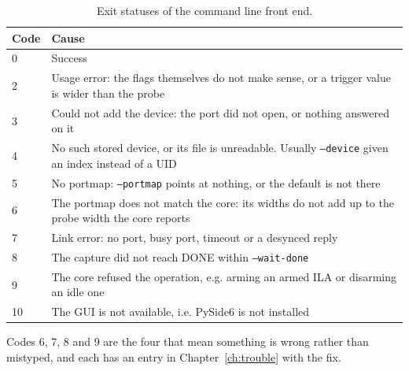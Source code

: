 \documentclass[../manual.tex]{subfiles}
\begin{document}
\begin{table}[H]
    \centering
    \begin{tabularx}{\textwidth}{|l|X|}
        \hline
        \rowcolor{gray!40} \textbf{Code} & \textbf{Cause} \\
        \hline
        0 & Success \\
        \hline
        2 & Usage error: the flags themselves do not make sense, or a trigger value is wider than the probe \\
        \hline
        3 & Could not add the device: the port did not open, or nothing answered on it \\
        \hline
        4 & No such stored device, or its file is unreadable. Usually \texttt{--device} given an index instead of a UID \\
        \hline
        5 & No portmap: \texttt{--portmap} points at nothing, or the default is not there \\
        \hline
        6 & The portmap does not match the core: its widths do not add up to the probe width the core reports \\
        \hline
        7 & Link error: no port, busy port, timeout or a desynced reply \\
        \hline
        8 & The capture did not reach DONE within \texttt{--wait-done} \\
        \hline
        9 & The core refused the operation, e.g. arming an armed ILA or disarming an idle one \\
        \hline
        10 & The GUI is not available, i.e. PySide6 is not installed \\
        \hline
    \end{tabularx}
    \caption{Exit statuses of the command line front end.}
    \label{tab:cli_exit}
\end{table}

Codes 6, 7, 8 and 9 are the four that mean something is wrong rather than mistyped, and each has an entry in Chapter~\ref{ch:trouble} with the fix.
\end{document}
